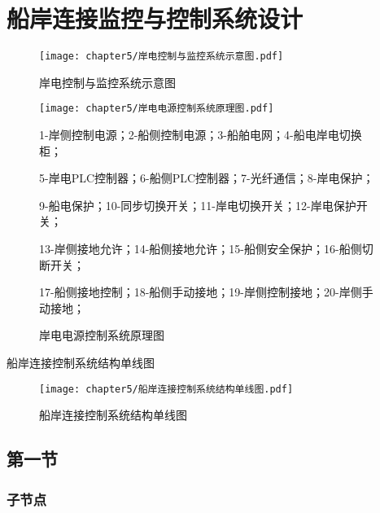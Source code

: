 \chapter{船岸连接监控与控制系统设计}

\begin{figure}[!htp]
	\centering
	\texttt{[image: chapter5/岸电控制与监控系统示意图.pdf]}
	\caption{岸电控制与监控系统示意图}
	\label{fig:岸电控制与监控系统示意图}
\end{figure}

\begin{figure}[!htp]
	\centering
	\texttt{[image: chapter5/岸电电源控制系统原理图.pdf]}
	\caption{岸电电源控制系统原理图}
	\label{fig:岸电电源控制系统原理图}
    {\kaishu {}
    \hspace*{\fill} 

    1-岸侧控制电源；2-船侧控制电源；3-船舶电网；4-船电岸电切换柜；

    5-岸电PLC控制器；6-船侧PLC控制器；7-光纤通信；8-岸电保护；

    9-船电保护；10-同步切换开关；11-岸电切换开关；12-岸电保护开关；
    
    13-岸侧接地允许；14-船侧接地允许；15-船侧安全保护；16-船侧切断开关；

    17-船侧接地控制；18-船侧手动接地；19-岸侧控制接地；20-岸侧手动接地；

    }
\end{figure}

船岸连接控制系统结构单线图

\begin{figure}[!htp]
	\centering
	\texttt{[image: chapter5/船岸连接控制系统结构单线图.pdf]}
	\caption{船岸连接控制系统结构单线图}
	\label{fig:船岸连接控制系统结构单线图}
\end{figure}


\section{第一节}

\subsection{子节点}